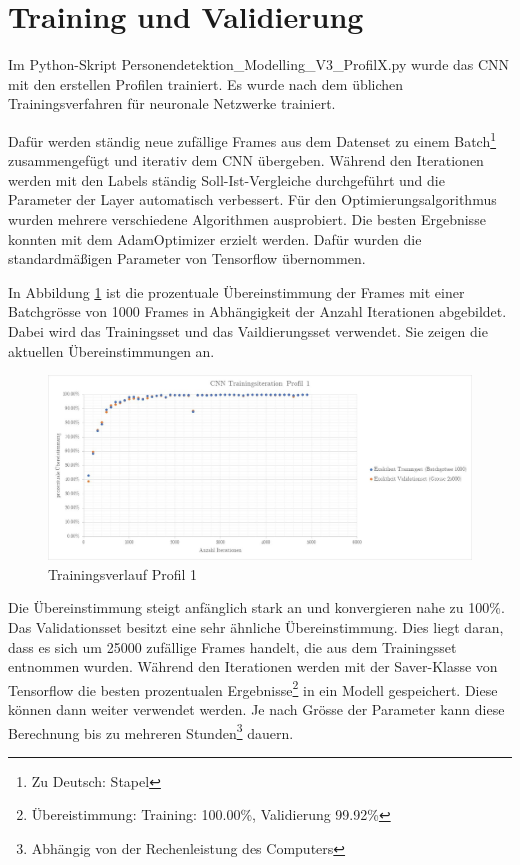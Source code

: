 \newpage
\section{Training und Validierung}
\label{TrainingValidierung}

Im Python-Skript Personendetektion\_Modelling\_V3\_ProfilX.py wurde das \ac{CNN} mit den erstellen Profilen trainiert. Es wurde nach dem üblichen Trainingsverfahren für neuronale Netzwerke trainiert.

Dafür werden ständig neue zufällige Frames aus dem Datenset zu einem Batch\footnote[29]{Zu Deutsch: Stapel} zusammengefügt und iterativ dem \ac{CNN} übergeben. Während den Iterationen werden mit den Labels ständig Soll-Ist-Vergleiche durchgeführt und die Parameter der Layer automatisch verbessert. 
Für den Optimierungsalgorithmus wurden mehrere verschiedene Algorithmen ausprobiert. Die besten Ergebnisse konnten mit dem AdamOptimizer erzielt werden. Dafür wurden die standardmäßigen Parameter von Tensorflow übernommen.

In Abbildung \ref{fig:traininsverlauf} ist die prozentuale Übereinstimmung der Frames mit einer Batchgrösse von 1000 Frames in Abhängigkeit der Anzahl Iterationen abgebildet. Dabei wird das Trainingsset und das Vaildierungsset verwendet. Sie zeigen die aktuellen Übereinstimmungen an. 

\begin{figure}[H]
	\centering
	\caption[Trainingsverlauf Profil 1]{Trainingsverlauf Profil 1}
	\label{fig:traininsverlauf}
	\includegraphics[width=1.0\linewidth]{fig/Traininsverlauf}
\end{figure}

Die Übereinstimmung steigt anfänglich stark an und konvergieren nahe zu 100\%. Das Validationsset besitzt eine sehr ähnliche Übereinstimmung. Dies liegt daran, dass es sich um 25000 zufällige Frames handelt, die aus dem Trainingsset entnommen wurden. Während den Iterationen werden mit der Saver-Klasse von Tensorflow die besten prozentualen Ergebnisse\footnote[30]{Übereistimmung: Training: 100.00\%, Validierung 99.92\%}  in ein Modell gespeichert. Diese können dann weiter verwendet werden. Je nach Grösse der Parameter kann diese Berechnung bis zu mehreren Stunden\footnote[31]{Abhängig von der Rechenleistung des Computers} dauern. 


